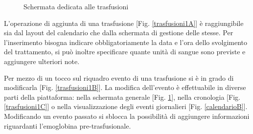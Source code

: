 \documentclass[12pt,a4paper,openright,twoside]{report}
\begin{document}
\begin{figure}[H]
\centering
{} \quad
{} \quad
\caption{Schermata dedicata alle trasfusioni}
\label{trasfusioni}
\end{figure}

L'operazione di aggiunta di una trasfusione [Fig. \ref{trasfusioni1A}] è raggiungibile sia dal layout del calendario che dalla schermata di gestione delle stesse. Per l'inserimento bisogna indicare obbligatoriamente la data e l'ora dello svolgimento del trattamento, si può inoltre specificare quante unità di sangue sono previste e aggiungere ulteriori note.

Per mezzo di un tocco sul riquadro evento di una trasfusione si è in grado di modificarla [Fig. \ref{trasfusioni1B}]. La modifica dell'evento è effettuabile in diverse parti della piattaforma: nella schermata generale [Fig. \ref{trasfusioni}], nella cronologia [Fig. \ref{trasfusioni1C}] o nella visualizzazione degli eventi giornalieri [Fig. \ref{calendarioB}]. Modificando un evento passato si sblocca la possibilità di aggiungere informazioni riguardanti l'emoglobina pre-trasfusionale.
\end{document}
